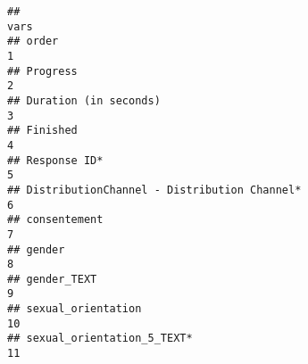 \documentclass[
]{article}
\begin{document}
\begin{verbatim}
##                                                                                                                                                                                                                            vars
## order                                                                                                                                                                                                                         1
## Progress                                                                                                                                                                                                                      2
## Duration (in seconds)                                                                                                                                                                                                         3
## Finished                                                                                                                                                                                                                      4
## Response ID*                                                                                                                                                                                                                  5
## DistributionChannel - Distribution Channel*                                                                                                                                                                                   6
## consentement                                                                                                                                                                                                                  7
## gender                                                                                                                                                                                                                        8
## gender_TEXT                                                                                                                                                                                                                   9
## sexual_orientation                                                                                                                                                                                                           10
## sexual_orientation_5_TEXT*                                                                                                                                                                                                   11

\end{verbatim}
\end{document}
